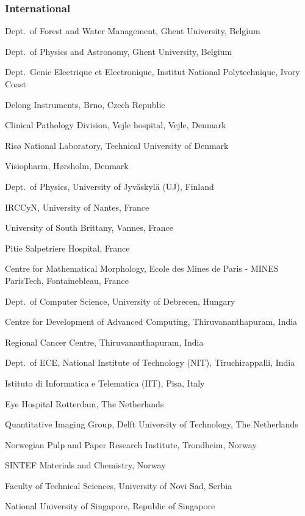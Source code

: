 \subsubsection*{International}
{\small
\begin{trivlist}
\item Dept.~of Forest and Water Management, Ghent University, Belgium
\item Dept.~of Physics and Astronomy, Ghent University, Belgium
\item Dept.~Genie Electrique et Electronique, Institut National Polytechnique, Ivory Coast
\item Delong Instruments, Brno, Czech Republic
\item Clinical Pathology Division, Vejle hospital, Vejle, Denmark
\item Ris{\o} National Laboratory, Technical University of Denmark
\item Visiopharm, H{\o}rsholm, Denmark
\item Dept.~of Physics, University of Jyv\"{a}skyl\"{a} (UJ), Finland
\item IRCCyN, University of Nantes, France\
\item University of South Brittany, Vannes, France
\item Pitie Salpetriere Hospital, France
\item Centre for Mathematical Morphology, Ecole des Mines de Paris - MINES ParisTech, Fontainebleau, France
\item Dept.~of Computer Science, University of Debrecen, Hungary
\item Centre for Development of Advanced Computing, Thiruvananthapuram, India
\item Regional Cancer Centre, Thiruvananthapuram, India
\item Dept.~of ECE, National Institute of Technology (NIT), Tiruchirappalli, India
\item Istituto di Informatica e Telematica (IIT), Pisa, Italy
\item Eye Hospital Rotterdam, The Netherlands
\item Quantitative Imaging Group, Delft University of Technology, The Netherlands
\item Norwegian Pulp and Paper Research Institute, Trondheim, Norway
\item SINTEF Materials and Chemistry, Norway
\item Faculty of Technical Sciences, University of Novi Sad, Serbia
\item National University of Singapore, Republic of Singapore

\end{trivlist}}
